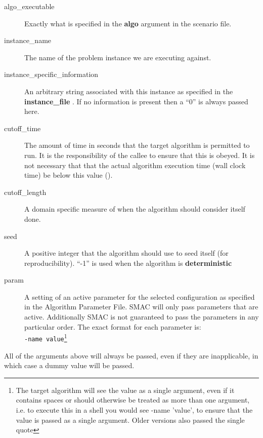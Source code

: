 \documentclass[manual.tex]{subfiles}
\begin{document}
\begin{description}
\item [{algo\_executable}] Exactly what is specified in the \textbf{algo} argument in the scenario file.
 
\item [{instance\_name}] The name of the problem instance we are executing
against.

\item [{instance\_specific\_information}] An arbitrary string associated
with this instance as specified in the \textbf{instance\_file }. If
no information is present then a ``0'' is always passed here. 

\item [{cutoff\_time}] The amount of time in seconds that the target algorithm
is permitted to run. It is the responsibility of the callee
to ensure that this is obeyed. It is not necessary that that the actual
algorithm execution time (wall clock time) be below this value ().

\item [{cutoff\_length}] A domain specific measure of when the algorithm should consider itself done.

\item [{seed}] A positive integer that the algorithm should use to seed
itself (for reproducibility). ``-1'' is used when the algorithm is \textbf{deterministic}

\item [{param}] A setting of an active parameter for the selected configuration
as specified in the Algorithm Parameter File. SMAC will only pass
parameters that are active. Additionally SMAC is not guaranteed
to pass the parameters in any particular order. The exact format for
each parameter is:\\
\texttt{-name~value}\footnote{The target algorithm will see the value as a single argument, even if it contains spaces or should otherwise be treated as more than one argument, i.e. to execute this in a shell you would see -name 'value', to ensure that the value is passed as a single argument. Older versions also passed the single quote}

\end{description}

All of the arguments above will always be passed, even if they are inapplicable, in which case a dummy value will be passed. \\
\end{document}
